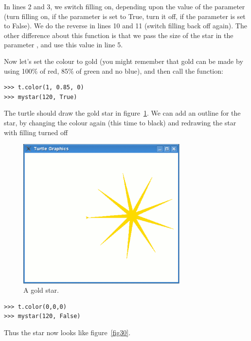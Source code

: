 In lines 2 and 3, we switch filling on, depending upon the value of the parameter  (turn filling on, if the parameter is set to True, turn it off, if the parameter is set to False).  We do the reverse in lines 10 and 11 (switch filling back off again).  The other difference about this function is that we pass the size of the star in the parameter , and use this value in line 5.
\par
Now let's set the colour to gold (you might remember that gold can be made by using 100\% of red, 85\% of green and no blue), and then call the function:

\begin{listing}
\begin{verbatim}
>>> t.color(1, 0.85, 0)
>>> mystar(120, True)
\end{verbatim}
\end{listing}

\noindent
The turtle should draw the gold star in figure~\ref{fig29}. We can add an outline for the star, by changing the colour again (this time to black) and redrawing the star with filling turned off

\begin{figure}
\begin{center}
\includegraphics[width=85mm]{eps/figure29.eps}
\end{center}
\caption{A gold star.}\label{fig29}
\end{figure}

\begin{listing}
\begin{verbatim}
>>> t.color(0,0,0)
>>> mystar(120, False)
\end{verbatim}
\end{listing}

\noindent
Thus the star now looks like figure~\ref{fig30}.

